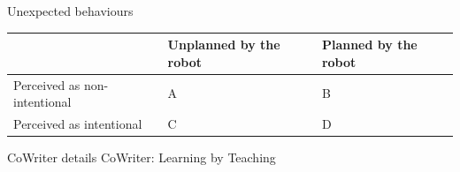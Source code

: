 \documentclass[compress]{beamer}
\begin{document}
{{\begin{frame}[plain]{}
{    }

\end{frame}
}







\begin{frame}{Unexpected behaviours}

    \centering
    \begin{tabular}{  >{\centering\arraybackslash}m{2cm} | >{\centering\arraybackslash}m{2cm} | >{\centering\arraybackslash}m{2cm} }
        & Unplanned by the robot & Planned by the robot \\ \hline
        Perceived as non-intentional & A  & B  \\ \hline
        Perceived as intentional &  C & D 
    \end{tabular}


\end{frame}



\begin{frame}{CoWriter details}
    \centering
    CoWriter: Learning by Teaching\\





\end{frame}}
\end{document}
